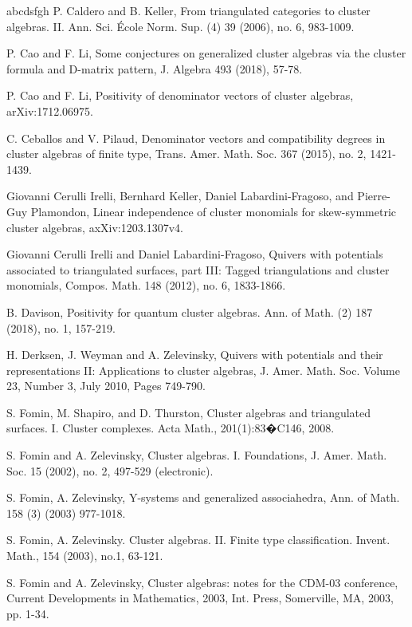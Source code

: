 \documentclass[14pt]{amsart}
\begin{document}
\begin{thebibliography}{abcdsfgh}
  P. Caldero and B. Keller, From triangulated categories to cluster algebras. II. Ann. Sci. \'{E}cole Norm. Sup. (4) 39 (2006), no. 6, 983-1009.

P. Cao and  F. Li, Some conjectures on generalized cluster algebras via the cluster formula and D-matrix pattern, J. Algebra 493 (2018), 57-78.

P. Cao and  F. Li, Positivity of denominator vectors of cluster algebras,  arXiv:1712.06975.

   C. Ceballos and V. Pilaud, Denominator vectors and compatibility degrees in cluster algebras of finite type,  Trans. Amer. Math. Soc. 367 (2015), no. 2, 1421-1439.

Giovanni Cerulli Irelli, Bernhard Keller, Daniel Labardini-Fragoso, and Pierre-Guy Plamondon, Linear independence of cluster monomials for skew-symmetric cluster algebras, axXiv:1203.1307v4.

Giovanni Cerulli Irelli and Daniel Labardini-Fragoso, Quivers with potentials associated to triangulated surfaces, part III: Tagged triangulations and cluster monomials, Compos. Math. 148 (2012), no. 6, 1833-1866.

 B. Davison, Positivity for quantum cluster algebras. Ann. of Math. (2) 187 (2018), no. 1, 157-219.

H. Derksen, J. Weyman and A. Zelevinsky, Quivers with potentials
and their representations II: Applications to cluster algebras, J. Amer. Math. Soc. Volume 23, Number 3, July 2010, Pages 749-790.



  S. Fomin, M. Shapiro, and D. Thurston, Cluster algebras and triangulated surfaces. I. Cluster complexes. Acta Math., 201(1):83�C146, 2008.

 S. Fomin and A. Zelevinsky, Cluster algebras. I. Foundations, J. Amer. Math. Soc. 15 (2002),
no. 2, 497-529 (electronic).

S. Fomin, A. Zelevinsky, Y-systems and generalized associahedra, Ann. of Math. 158 (3) (2003) 977-1018.

 S. Fomin,  A. Zelevinsky. Cluster algebras. II. Finite type classification. Invent. Math., 154 (2003), no.1, 63-121.

S. Fomin and A. Zelevinsky, Cluster algebras: notes for the CDM-03 conference, Current
Developments in Mathematics, 2003, Int. Press, Somerville, MA, 2003, pp. 1-34.


\end{thebibliography}
\end{document}

